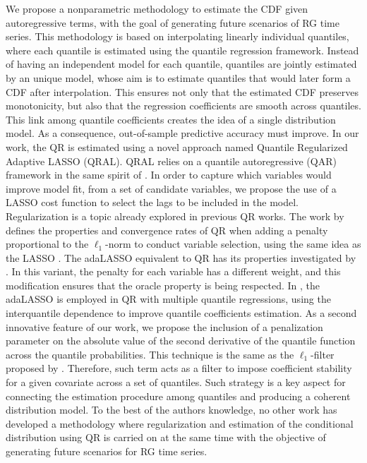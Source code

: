 We propose a nonparametric methodology to estimate the CDF given autoregressive terms, with the goal of generating future scenarios of RG time series. This methodology is based on interpolating linearly individual quantiles, where each quantile is estimated using the quantile regression framework.
Instead of having an independent model for each quantile, quantiles are jointly estimated by an unique model, whose aim is to estimate quantiles that would later form a CDF after interpolation. This ensures not only that the estimated CDF preserves monotonicity, but also that the regression coefficients are smooth across quantiles. This link among quantile coefficients creates the idea of a single distribution model. As a consequence, out-of-sample predictive accuracy must improve.
In our work, the QR is estimated using a novel approach named Quantile Regularized Adaptive LASSO (QRAL).
QRAL relies on a quantile autoregressive (QAR) framework in the same spirit of \cite{koenker1978regression,koenker_quantile_2006,koenker2005quantile}. In order to capture which variables would improve model fit, from a set of candidate variables, we propose the use of a LASSO cost function to select the lags to be included in the model. Regularization is a topic already explored in previous QR works. The work by \cite{belloni_l1-penalized_2009} defines the properties and convergence rates of QR when adding a penalty proportional to the $\ell_1$-norm to conduct variable selection, using the same idea as the LASSO \cite{tibshirani1996regression}. The adaLASSO equivalent to QR has its properties investigated by \cite{ciuperca_adaptive_2016}. In this variant, the penalty for each variable has a different weight, and this modification ensures that the oracle property is being respected. %
In \cite{zou_regularized_2008,jiang_interquantile_2014}, the adaLASSO is employed in QR with multiple quantile regressions, using the interquantile dependence to improve  quantile coefficients estimation.
As a second innovative feature of our work, we propose the inclusion of a penalization parameter on the absolute value of the second derivative of the quantile function across the quantile probabilities. 
This technique is the same as the $\ell_1$-filter proposed by \cite{boyd2011distributed}. 
Therefore, such term acts as a filter to impose coefficient stability for a given covariate across a set of quantiles. Such strategy is a key aspect for connecting the estimation procedure among quantiles and producing a coherent distribution model.
To the best of the authors knowledge, no other work has developed a methodology where regularization and estimation of the conditional distribution using QR is carried on at the same time with the objective of generating future scenarios for RG time series.

